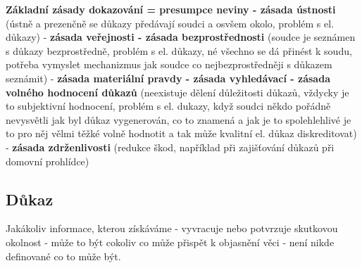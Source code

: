 \textbf{Základní zásady dokazování = presumpce neviny - zásada ústnosti} (ústně a prezenčně se
důkazy předávají soudci a osvšem okolo, problém s el. důkazy) - \textbf{zásada veřejnosti - zásada
bezprostřednosti} (soudce je seznámen s důkazy bezprostředně, problém s el. důkazy, né
všechno se dá přinést k soudu, potřeba vymyslet mechanizmus jak soudce co nejbezprostředněji
s důkazem seznámit) - \textbf{zásada materiální pravdy - zásada vyhledávací - zásada volného
hodnocení důkazů} (neexistuje dělení důležitosti důkazů, vždycky je to subjektivní hodnocení,
problém s el. dukazy, když soudci někdo pořádně nevysvětli jak byl důkaz vygenerován, co to
znamená a jak je to spolehlehlivé je to pro něj vělmi těžké volně hodnotit a tak může kvalitní el.
důkaz diskreditovat) - \textbf{zásada zdrženlivosti} (redukce škod, například při zajišťování důkazů při
domovní prohlídce)

\subsection{Důkaz}
Jakákoliv informace, kterou získáváme - vyvracuje nebo potvrzuje skutkovou
okolnost - může to být cokoliv co může přispět k objasnění věci - není nikde definované co to
může být.

